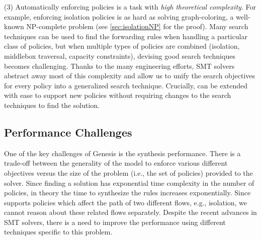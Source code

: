 (3) Automatically enforcing policies is a task with
\emph{high theoretical complexity}. 
For example, enforcing isolation policies
is as hard as solving
graph-coloring, a well-known
NP-complete problem (see \cref{sec:isolationNP} for the proof).
Many search techniques can be used to find the forwarding rules when
handling a particular class of policies, but when multiple types of
policies are combined (isolation, middlebox traversal, capacity
constraints), devising good search techniques becomes challenging.
Thanks to the many engineering efforts, SMT solvers abstract away most
of this complexity and allow us to unify the search objectives for
every policy into a generalized search technique.
Crucially, \Name can be extended with ease to
support new policies without requiring changes to the search
techniques to find the solution.

\subsection{Performance Challenges} \label{sec:performance}

One of the key challenges of Genesis is the synthesis
performance. There is a trade-off between the generality of the model
to enforce various different objectives versus the size of the problem
(i.e., the set of policies)  provided to the
solver.  Since finding a solution has exponential time complexity in
the number of policies, in theory the time to synthesize the rules
increases exponentially. Since \Name supports policies which affect
the path of two different flows, e.g., isolation, we cannot reason
about these related flows separately. 
Despite the recent advances in SMT solvers, there is a need to improve the performance
using different techniques specific to this problem.



